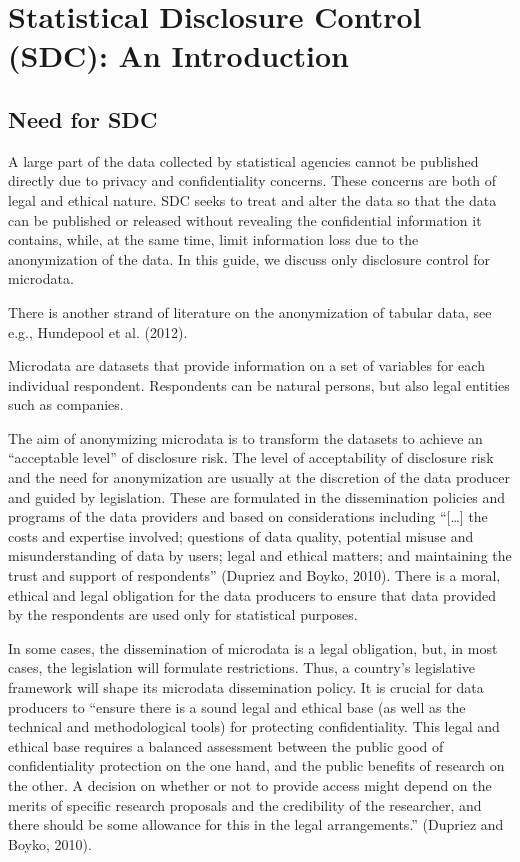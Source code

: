 \documentclass[letterpaper,10pt,english]{sphinxmanual}
\begin{document}
\chapter{Statistical Disclosure Control (SDC): An Introduction}
\label{\detokenize{SDC_intro::doc}}\label{\detokenize{SDC_intro:statistical-disclosure-control-sdc-an-introduction}}

\section{Need for SDC}
\label{\detokenize{SDC_intro:need-for-sdc}}
A large part of the data collected by statistical agencies cannot be
published directly due to privacy and confidentiality concerns. These
concerns are both of legal and ethical nature. SDC seeks to treat and
alter the data so that the data can be published or released without
revealing the confidential information it contains, while, at the same
time, limit information loss due to the anonymization of the data. In
this guide, we discuss only disclosure control for
microdata. %
\begin{footnote}[1]\sphinxAtStartFootnote
There is another strand of literature on the anonymization of tabular
data, see e.g., Hundepool et al. (2012).
%
\end{footnote} Microdata are datasets that provide
information on a set of variables for each individual respondent.
Respondents can be natural persons, but also legal entities such as
companies.

The aim of anonymizing microdata is to transform the datasets to achieve
an “acceptable level” of disclosure risk. The level of acceptability of
disclosure risk and the need for anonymization are usually at the
discretion of the data producer and guided by legislation. These are
formulated in the dissemination policies and programs of the data
providers and based on considerations including “{[}…{]} the costs and
expertise involved; questions of data quality, potential misuse and
misunderstanding of data by users; legal and ethical matters; and
maintaining the trust and support of respondents” (Dupriez and Boyko,
2010). There is a moral, ethical and legal obligation for the data
producers to ensure that data provided by the respondents are used only
for statistical purposes.

In some cases, the dissemination of microdata is a legal obligation,
but, in most cases, the legislation will formulate restrictions. Thus, a
country’s legislative framework will shape its microdata dissemination
policy. It is crucial for data producers to “ensure there is a sound
legal and ethical base (as well as the technical and methodological
tools) for protecting confidentiality. This legal and ethical base
requires a balanced assessment between the public good of
confidentiality protection on the one hand, and the public benefits of
research on the other. A decision on whether or not to provide access
might depend on the merits of specific research proposals and the
credibility of the researcher, and there should be some allowance for
this in the legal arrangements.” (Dupriez and Boyko, 2010).
\end{document}
